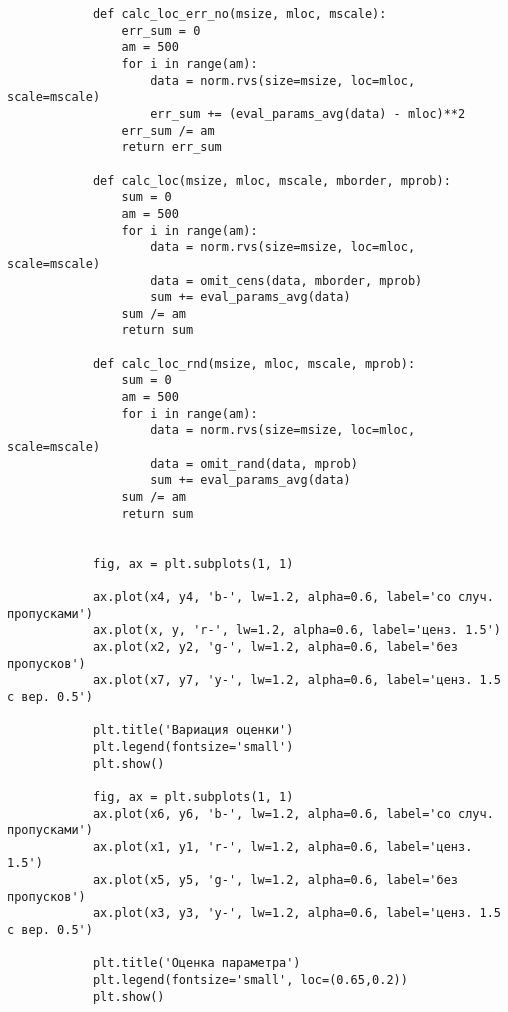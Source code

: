 \begin{verbatim}
            def calc_loc_err_no(msize, mloc, mscale):
                err_sum = 0
                am = 500
                for i in range(am):
                    data = norm.rvs(size=msize, loc=mloc, scale=mscale)
                    err_sum += (eval_params_avg(data) - mloc)**2
                err_sum /= am
                return err_sum

            def calc_loc(msize, mloc, mscale, mborder, mprob):
                sum = 0
                am = 500
                for i in range(am):
                    data = norm.rvs(size=msize, loc=mloc, scale=mscale)
                    data = omit_cens(data, mborder, mprob)
                    sum += eval_params_avg(data)
                sum /= am
                return sum

            def calc_loc_rnd(msize, mloc, mscale, mprob):
                sum = 0
                am = 500
                for i in range(am):
                    data = norm.rvs(size=msize, loc=mloc, scale=mscale)
                    data = omit_rand(data, mprob)
                    sum += eval_params_avg(data)
                sum /= am
                return sum


            fig, ax = plt.subplots(1, 1)

            ax.plot(x4, y4, 'b-', lw=1.2, alpha=0.6, label='со случ. пропусками')
            ax.plot(x, y, 'r-', lw=1.2, alpha=0.6, label='ценз. 1.5')
            ax.plot(x2, y2, 'g-', lw=1.2, alpha=0.6, label='без пропусков')
            ax.plot(x7, y7, 'y-', lw=1.2, alpha=0.6, label='ценз. 1.5 с вер. 0.5')

            plt.title('Вариация оценки')
            plt.legend(fontsize='small')
            plt.show()

            fig, ax = plt.subplots(1, 1)
            ax.plot(x6, y6, 'b-', lw=1.2, alpha=0.6, label='со случ. пропусками')
            ax.plot(x1, y1, 'r-', lw=1.2, alpha=0.6, label='ценз. 1.5')
            ax.plot(x5, y5, 'g-', lw=1.2, alpha=0.6, label='без пропусков')
            ax.plot(x3, y3, 'y-', lw=1.2, alpha=0.6, label='ценз. 1.5 с вер. 0.5')

            plt.title('Оценка параметра')
            plt.legend(fontsize='small', loc=(0.65,0.2))
            plt.show()

        \end{verbatim}